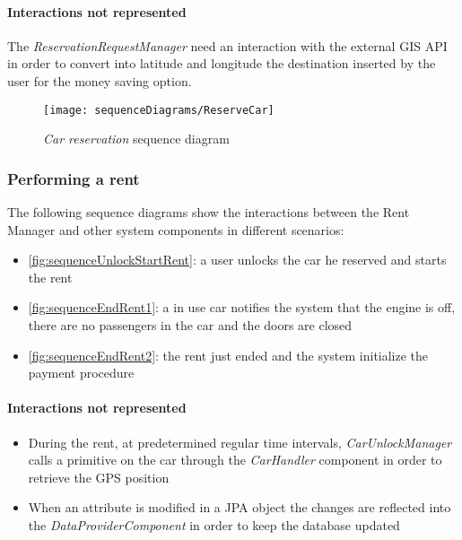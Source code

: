 \paragraph{Interactions not represented}The \emph{ReservationRequestManager} need an interaction with the external GIS API in order to convert into latitude and longitude the destination inserted by the user for the money saving option.
\begin{figure}[h!]
	\centering
	\texttt{[image: sequenceDiagrams/ReserveCar]}
	\caption{
		\label{fig:sequenceCarReservation} 
		\emph{Car reservation} sequence diagram
	}
\end{figure}

\clearpage
\subsubsection{Performing a rent}
The following sequence diagrams show the interactions between the \mbox{Rent} \mbox{Manager} and other system components in different scenarios:
\begin{itemize}
	\item \autoref{fig:sequenceUnlockStartRent}: a user unlocks the car he reserved and starts the rent
	\item \autoref{fig:sequenceEndRent1}: a in use car notifies the system that the engine is off, there are no passengers in the car and the doors are closed
	\item \autoref{fig:sequenceEndRent2}: the rent just ended and the system initialize the payment procedure
\end{itemize}

\paragraph{Interactions not represented}
\begin{itemize}
	\item During the rent, at predetermined regular time intervals, \emph{CarUnlockManager} calls a primitive on the car through the \emph{CarHandler} component in order to retrieve the GPS position

	\item When an attribute is modified in a JPA object the changes are reflected into the \emph{DataProviderComponent} in order to keep the database updated
\end{itemize}
\clearpage

